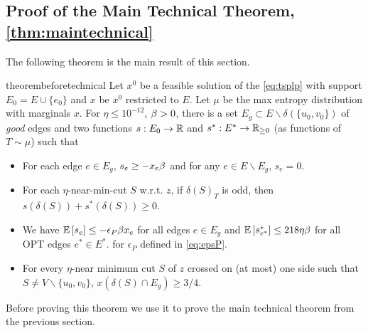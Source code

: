 \subsection{Proof of the Main Technical Theorem, \cref{thm:maintechnical}}
The following theorem is the main result of this section.
\begin{restatable}{theorem}{beforetechnical}\label{lem:beforetechnicalthm}
Let $x^0$ be a feasible solution of the \ref{eq:tsplp} with support $E_0=E\cup\{e_0\}$ and $x$ be $x^0$ restricted to $E$.
Let $\mu$ be the max entropy distribution with marginals $x$.
For $\eta\leq 10^{-12}$, $\beta > 0$, there is a set $E_g\subset E\smallsetminus \delta(\{u_0,v_0\})$  of {\em good} edges
and two functions $s: E_0\rightarrow \mathbb{R}$ and $s^*: E^* \rightarrow \mathbb{R} _{\ge 0}$ (as functions of $T\sim\mu$) such that
	\begin{itemize}
\item[(i)] 	For each edge $e \in E_g$, $s_e \ge -x_e \beta$ and for any $e\in E\smallsetminus E_g$, $s_e=0$.
\item[(ii)] For each $\eta$-near-min-cut $S$ w.r.t. $z$, if $\delta(S)_T$ is odd, then $  s(\delta(S)) + s^*(\delta(S)) \ge  0.$
\item[(iii)] We have ${\mathbb{E}}\left[s_e\right] \le -\epsilon_P \beta x_e$  for all edges $e \in E_g$  and ${\mathbb{E}}\left[s^*_{e^*}\right] \le 218 \eta \beta$ for all OPT edges $e^* \in E^*.$
for $\epsilon_P$ defined in \eqref{eq:epsP}.
\item[(iv)] For every $\eta$-near minimum cut $S$ of $z$ crossed on (at most) one side such that $S\neq V\smallsetminus \{u_0,v_0\}$, $x(\delta(S)\cap E_g) \ge 3/4.$
\end{itemize}
\end{restatable}
Before proving this theorem we use it to prove the main technical theorem from the previous section.
\maintechnical*
